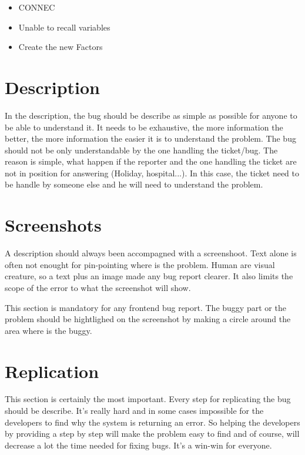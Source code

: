 \documentclass[a4paper,article,oneside]{memoir}
\begin{document}
\noindent{}

\begin{itemize}
  \item CONNEC
  \item Unable to recall variables
  \item Create the new Factors
\end{itemize}
	
		
        \chapter{Description}
        In the description, the bug should be describe as simple as possible for anyone to be able to understand it. It needs to be exhaustive, the more information the better, the more information the easier it is to understand the problem. The bug should not be only understandable by the one handling the ticket/bug. The reason is simple, what happen if the reporter and the one handling the ticket are not in position for answering (Holiday, hospital...). In this case, the ticket need to be handle by someone else and he will need to understand the problem.
        
\noindent{}

\noindent{}

        \chapter{Screenshots}
        A description should always been accompagned with a screenshoot. Text alone is often not enought for pin-pointing where is the problem. Human are visual creature, so a text plus an image made any bug report clearer. It also limits the scope of the error to what the screenshot will show.
        
        This section is mandatory for any frontend bug report. The buggy part or the problem should be hightlighed on the screenshot by making a circle around the area where is the buggy.
        
\noindent{}

\noindent{}    
        
        \chapter{Replication}
        This section is certainly the most important. Every step for replicating the bug should be describe. It's really hard and in some cases impossible for the developers to find why the system is returning an error. So helping the developers by providing a step by step will make the problem easy to find and of course, will decrease a lot the time needed for fixing bugs. It's a win-win for everyone.
\end{document}
